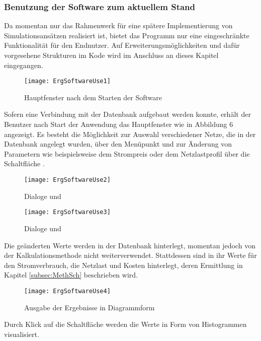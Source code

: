\subsubsection{Benutzung der Software zum aktuellem Stand}
Da momentan nur das Rahmenwerk für eine spätere Implementierung von Simulationsansätzen realisiert ist, bietet das Programm nur eine eingeschränkte Funktionalität für den Endnutzer. Auf Erweiterungsmöglichkeiten und dafür vorgesehene Strukturen im Kode wird im Anschluss an dieses Kapitel eingegangen.
\begin{figure}[ht]
	\centering
	\texttt{[image: ErgSoftwareUse1]}
	\caption{Hauptfenster nach dem Starten der Software}
	\label{fig:ErgSoftwareUse1}
\end{figure}
Sofern eine Verbindung mit der Datenbank aufgebaut werden konnte, erhält der Benutzer nach Start der Anwendung das Hauptfenster wie in Abbildung 6 angezeigt. Es besteht die Möglichkeit zur Auswahl verschiedener Netze, die in der Datenbank angelegt wurden, über den Menüpunkt  und zur Änderung von Parametern wie beispielsweise dem Strompreis oder dem Netzlastprofil über die Schaltfläche .
\begin{figure}[ht]
	\centering
	\texttt{[image: ErgSoftwareUse2]}
	\caption{Dialoge  und }
	\label{fig:ErgSoftwareUse2}
\end{figure}
\begin{figure}[ht]
	\centering
	\texttt{[image: ErgSoftwareUse3]}
	\caption{Dialoge  und }
	\label{fig:ErgSoftwareUse3}
\end{figure}
Die geänderten Werte werden in der Datenbank hinterlegt, momentan jedoch von der Kalkulationsmethode nicht weiterverwendet. Stattdessen sind in ihr Werte für den Stromverbrauch, die Netzlast und Kosten hinterlegt, deren Ermittlung in Kapitel \ref{subsec:MethSch} beschrieben wird.
\begin{figure}[ht]
	\centering
	\texttt{[image: ErgSoftwareUse4]}
	\caption{Ausgabe der Ergebnisse in Diagrammform}
	\label{fig:ErgSoftwareUse4}
\end{figure}
Durch Klick auf die Schaltfläche  werden die Werte in Form von Histogrammen visualisiert.

